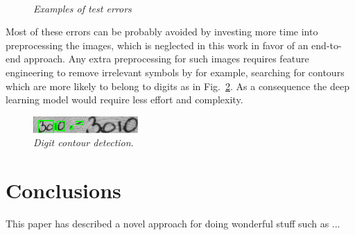 \begin{figure}[t]
    \centering
    \hfill
    \hfill
    \hfill
   \\
  \caption{{\it Examples of test errors}}
  \label{fig_methods} 
\end{figure}

Most of these errors can be probably avoided by investing more time into preprocessing the images, which is neglected in this work in favor of an end-to-end approach. Any extra preprocessing for such images requires feature engineering to remove irrelevant symbols by for example, searching for contours which are more likely to belong to digits as in Fig.~\ref{fig_preproc}. As a consequence the deep learning model would require less effort and complexity.  

\begin{figure}[t]
\centerline{\includegraphics[width=40mm]{images/preproc}}
\caption{{\it Digit contour detection}.}  
\label{fig_preproc}
\end{figure}

\section{Conclusions}

This paper has described a novel approach for doing wonderful stuff such as ...